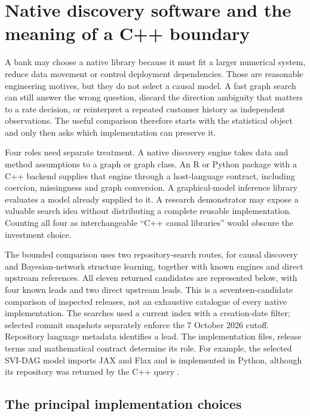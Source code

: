 \section{Native discovery software and the meaning of a C++ boundary}
\label{exec13:cxx-discovery}

A bank may choose a native library because it must fit a larger numerical
system, reduce data movement or control deployment dependencies. Those are
reasonable engineering motives, but they do not select a causal model. A
fast graph search can still answer the wrong question, discard the direction
ambiguity that matters to a rate decision, or reinterpret a repeated customer
history as independent observations. The useful comparison therefore starts
with the statistical object and only then asks which implementation can
preserve it.

Four roles need separate treatment. A native discovery engine takes data and
method assumptions to a graph or graph class. An R or Python package with a
C++ backend supplies that engine through a host-language contract, including
coercion, missingness and graph conversion. A graphical-model inference
library evaluates a model already supplied to it. A research demonstrator
may expose a valuable search idea without distributing a complete reusable
implementation. Counting all four as interchangeable ``C++ causal
libraries'' would obscure the investment choice.

The bounded comparison uses two repository-search routes, for causal discovery
and Bayesian-network structure learning, together with known engines and
direct upstream references. All eleven returned candidates are represented
below, with four known leads and two direct upstream leads. This is a
seventeen-candidate comparison of inspected releases, not an exhaustive
catalogue of every native implementation. The searches used a current index
with a creation-date filter; selected commit snapshots separately enforce the
7 October 2026 cutoff. Repository language metadata identifies a lead. The
implementation files, release terms and mathematical contract determine its
role. For example, the selected SVI-DAG model imports JAX and Flax and is
implemented in Python, although its repository was returned by the C++ query
\citep{exec13_cxx_svidag}.

\subsection{The principal implementation choices}


